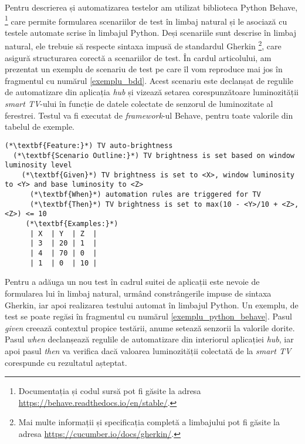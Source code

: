 Pentru descrierea și automatizarea testelor am utilizat biblioteca Python Behave, \footnote{Documentația și codul sursă pot fi găsite la adresa \url{https://behave.readthedocs.io/en/stable/}.} care permite formularea scenariilor de test în limbaj natural și le asociază cu testele automate scrise în limbajul Python. Deși scenariile sunt descrise în limbaj natural, ele trebuie să respecte sintaxa impusă de standardul Gherkin \footnote{Mai multe informații și specificația completă a limbajului pot fi găsite la adresa \url{https://cucumber.io/docs/gherkin/}.}, care asigură structurarea corectă a scenariilor de test. În cardul articolului, am prezentat un exemplu de scenariu de test pe care îl vom reproduce mai jos în fragmentul cu numărul \ref{exemplu_bdd}. Acest scenariu este declanșat de regulile de automatizare din aplicația \textit{hub} și vizează setarea corespunzătoare luminozității \textit{smart TV}-ului în funcție de datele colectate de senzorul de luminozitate al ferestrei. Testul va fi executat de \textit{framework}-ul Behave, pentru toate valorile din tabelul de exemple.

\begin{lstlisting}[caption={Exemplu de scenariu de test BDD pentru aplicațiile din suită}, label={exemplu_bdd}]
(*\textbf{Feature:}*) TV auto-brightness
  (*\textbf{Scenario Outline:}*) TV brightness is set based on window luminosity level
    (*\textbf{Given}*) TV brightness is set to <X>, window luminosity to <Y> and base luminosity to <Z>
      (*\textbf{When}*) automation rules are triggered for TV
      (*\textbf{Then}*) TV brightness is set to max(10 - <Y>/10 + <Z>, <Z>) <= 10
     (*\textbf{Examples:}*)
      | X  | Y  | Z  |
      | 3  | 20 | 1  |
      | 4  | 70 | 0  |
      | 1  | 0  | 10 |
\end{lstlisting}

Pentru a adăuga un nou test în cadrul suitei de aplicații este nevoie de formularea lui în limbaj natural, urmând constrângerile impuse de sintaxa Gherkin, iar apoi realizarea testului automat în limbajul Python. Un exemplu, de test se poate regăsi în fragmentul cu numărul \ref{exemplu_python_behave}. Pasul \textit{given} creează contextul propice testării, anume setează senzorii la valorile dorite. Pasul \textit{when} declanșează regulile de automatizare din interiorul aplicației \textit{hub}, iar apoi pasul \textit{then} va verifica dacă valoarea luminozității colectată de la \textit{smart TV} corespunde cu rezultatul așteptat.

